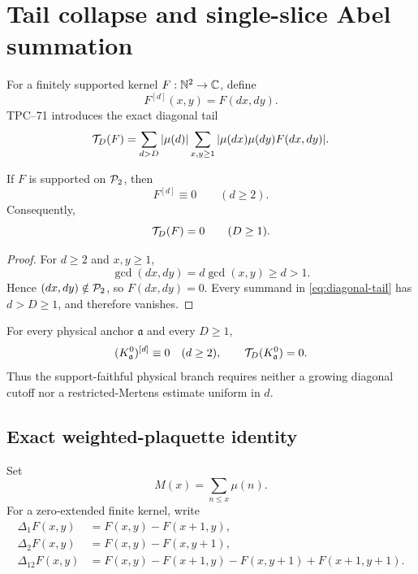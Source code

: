 \section{Tail collapse and single-slice Abel summation}
\label{sec:tail-collapse}

For a finitely supported kernel \(F:\mathbb N^2\to\mathbb C\), define
\[
 F^{[d]}(x,y)=F(dx,dy).
\]
TPC--71 \citep{WangTPC71} introduces the exact diagonal tail
\begin{equation}
 \mathcal T_D(F)
 =
 \sum_{d>D}|\mu(d)|
 \sum_{x,y\ge1}
 |\mu(dx)\mu(dy)F(dx,dy)|.
 \label{eq:diagonal-tail}
\end{equation}

\begin{theorem}
\label{thm:primitive-support-collapse}
If \(F\) is supported on \(\mathcal P_2\), then
\begin{equation}
 F^{[d]}\equiv0\qquad(d\ge2).
 \label{eq:higher-slices-vanish}
\end{equation}
Consequently,
\begin{equation}
 \mathcal T_D(F)=0\qquad(D\ge1).
 \label{eq:tail-vanishes}
\end{equation}
\end{theorem}

\begin{proof}
For \(d\ge2\) and \(x,y\ge1\),
\[
 \gcd(dx,dy)=d\gcd(x,y)\ge d>1.
\]
Hence \((dx,dy)\notin\mathcal P_2\), so \(F(dx,dy)=0\).  Every summand in
\eqref{eq:diagonal-tail} has \(d>D\ge1\), and therefore vanishes.
\end{proof}

\begin{corollary}
\label{cor:physical-diagonal-collapse}
For every physical anchor \(\mathfrak a\) and every \(D\ge1\),
\[
 (K_{\mathfrak a}^{0})^{[d]}\equiv0\quad(d\ge2),
 \qquad
 \mathcal T_D(K_{\mathfrak a}^{0})=0.
\]
Thus the support-faithful physical branch requires neither a growing
diagonal cutoff nor a restricted-Mertens estimate uniform in \(d\).
\end{corollary}

\subsection{Exact weighted-plaquette identity}

Set
\[
 M(x)=\sum_{n\le x}\mu(n).
\]
For a zero-extended finite kernel, write
\begin{align*}
 \Delta_1F(x,y)&=F(x,y)-F(x+1,y),\\
 \Delta_2F(x,y)&=F(x,y)-F(x,y+1),\\
 \Delta_{12}F(x,y)
 &=F(x,y)-F(x+1,y)-F(x,y+1)+F(x+1,y+1).
\end{align*}

